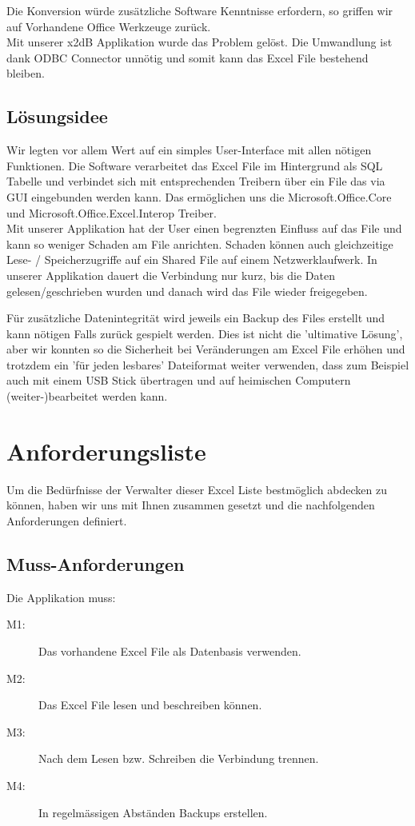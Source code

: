 \documentclass{article}
\begin{document}
Die Konversion würde zusätzliche Software Kenntnisse erfordern, so griffen wir auf Vorhandene Office Werkzeuge zurück. \\

Mit unserer x2dB Applikation wurde das Problem gelöst. Die Umwandlung ist dank ODBC Connector unnötig und somit kann das Excel File bestehend bleiben.

\subsection{Lösungsidee}
Wir legten vor allem Wert auf ein simples User-Interface mit allen nötigen Funktionen. Die Software verarbeitet das Excel File im Hintergrund als SQL Tabelle und verbindet sich mit entsprechenden Treibern über ein File das via GUI eingebunden werden kann. Das ermöglichen uns die Microsoft.Office.Core und Microsoft.Office.Excel.Interop Treiber. \\

Mit unserer Applikation hat der User einen begrenzten Einfluss auf das File und kann so weniger Schaden am File anrichten. Schaden können auch gleichzeitige Lese- / Speicherzugriffe auf ein Shared File auf einem Netzwerklaufwerk. In unserer Applikation dauert die Verbindung nur kurz, bis die Daten gelesen/geschrieben wurden und danach wird das File wieder freigegeben.

Für zusätzliche Datenintegrität wird jeweils ein Backup des Files erstellt und kann nötigen Falls zurück gespielt werden. Dies ist nicht die 'ultimative Lösung', aber wir konnten so die Sicherheit bei Veränderungen am Excel File erhöhen und trotzdem ein 'für jeden lesbares' Dateiformat weiter verwenden, dass zum Beispiel auch mit einem USB Stick übertragen und auf heimischen Computern (weiter-)bearbeitet werden kann.

\section{Anforderungsliste}
Um die Bedürfnisse der Verwalter dieser Excel Liste bestmöglich abdecken zu können, haben wir uns mit Ihnen zusammen gesetzt und die nachfolgenden Anforderungen definiert. 
	
\subsection{Muss-Anforderungen}
Die Applikation muss:
	\begin{description}
		\item[M1:] Das vorhandene Excel File als Datenbasis verwenden.
		\item[M2:] Das Excel File lesen und beschreiben können.
		\item[M3:] Nach dem Lesen bzw. Schreiben die Verbindung trennen.
		\item[M4:] In regelmässigen Abständen Backups erstellen.
	\end{description}
\end{document}
